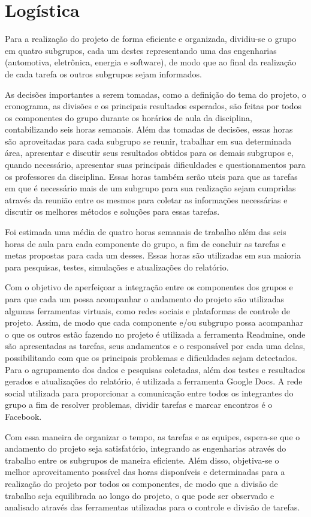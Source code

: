 
\chapter*[Logística]{Logística}

Para a realização do projeto de forma eficiente e organizada, dividiu-se o grupo em quatro subgrupos, cada um destes representando uma das engenharias (automotiva, eletrônica, energia e software), de modo que ao final da realização de cada tarefa os outros subgrupos sejam informados.

As decisões importantes a serem tomadas, como a definição do tema do projeto, o cronograma, as divisões e os principais resultados esperados, são feitas por todos os componentes do grupo durante os horários de aula da disciplina, contabilizando seis horas semanais. Além das tomadas de decisões, essas horas são aproveitadas para cada subgrupo se reunir, trabalhar em sua determinada área, apresentar e discutir seus resultados obtidos para os demais subgrupos e, quando necessário, apresentar suas principais dificuldades e questionamentos para os professores da disciplina. Essas horas também serão uteis para que as tarefas em que é necessário mais de um subgrupo para sua realização sejam cumpridas através da reunião entre os mesmos para coletar as informações necessárias e discutir os melhores métodos e soluções para essas tarefas.

Foi estimada uma média de quatro horas semanais de trabalho além das seis horas de aula para cada componente do grupo, a fim de concluir as tarefas e metas propostas para cada um desses. Essas horas são utilizadas em sua maioria para pesquisas, testes, simulações e atualizações do relatório. 

Com o objetivo de aperfeiçoar a integração entre os componentes dos grupos e para que cada um possa acompanhar o andamento do projeto são utilizadas algumas ferramentas virtuais, como redes sociais e plataformas de controle de projeto. Assim, de modo que cada componente e/ou subgrupo possa acompanhar o que os outros estão fazendo no projeto é utilizada a ferramenta Readmine, onde são apresentadas as tarefas, seus andamentos e o responsável por cada uma delas, possibilitando com que os principais problemas e dificuldades sejam detectados. Para o agrupamento dos dados e pesquisas coletadas, além dos testes e resultados gerados e atualizações do relatório, é utilizada a ferramenta Google Docs. A rede social utilizada para proporcionar a comunicação entre todos os integrantes do grupo a fim de resolver problemas, dividir tarefas e marcar encontros é o Facebook.

Com essa maneira de organizar o tempo, as tarefas e as equipes, espera-se que o andamento do projeto seja satisfatório, integrando as engenharias através do trabalho entre os subgrupos de maneira eficiente. Além disso, objetiva-se o melhor aproveitamento possível das horas disponíveis e determinadas para a realização do projeto por todos os componentes, de modo que a divisão de trabalho seja equilibrada ao longo do projeto, o que pode ser observado e analisado através das ferramentas utilizadas para o controle e divisão de tarefas.

